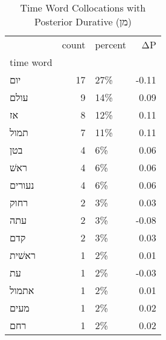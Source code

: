 \begin{table}[htbp!]
\centering
\caption{Time Word Collocations with Posterior Durative (מן)}
\label{table:postdurמן_head_cpd}
\begin{tabular}{lrlr}
\toprule
{} &  count & percent &    ΔP \\
time word &        &         &       \\
\midrule
יום       &     17 &     27\% & -0.11 \\
עולם      &      9 &     14\% &  0.09 \\
אז        &      8 &     12\% &  0.11 \\
תמול      &      7 &     11\% &  0.11 \\
בטן       &      4 &      6\% &  0.06 \\
ראשׁ      &      4 &      6\% &  0.06 \\
נעורים    &      4 &      6\% &  0.06 \\
רחוק      &      2 &      3\% &  0.03 \\
עתה       &      2 &      3\% & -0.08 \\
קדם       &      2 &      3\% &  0.03 \\
ראשׁית    &      1 &      2\% &  0.01 \\
עת        &      1 &      2\% & -0.03 \\
אתמול     &      1 &      2\% &  0.01 \\
מעים      &      1 &      2\% &  0.02 \\
רחם       &      1 &      2\% &  0.02 \\
\bottomrule
\end{tabular}
\end{table}
